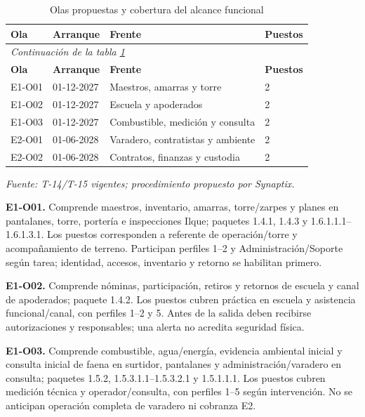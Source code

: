 \begingroup\small\setlength{\tabcolsep}{3pt}
\begin{longtable}{p{}p{}p{}p{}}
\caption{Olas propuestas y cobertura del alcance funcional}\label{tab:t18-olas}\\\hline
\textbf{Ola} & \textbf{Arranque} & \textbf{Frente} & \textbf{Puestos}\\\hline\endfirsthead
\multicolumn{4}{l}{\textit{Continuación de la tabla \ref{tab:t18-olas}}}\\\hline
\textbf{Ola} & \textbf{Arranque} & \textbf{Frente} & \textbf{Puestos}\\\hline\endhead
\hline\endfoot\hline\endlastfoot
E1-O01 & 01-12-2027 & Maestros, amarras y torre & 2\\\hline
E1-O02 & 01-12-2027 & Escuela y apoderados & 2\\\hline
E1-O03 & 01-12-2027 & Combustible, medición y consulta & 2\\\hline
E2-O01 & 01-06-2028 & Varadero, contratistas y ambiente & 2\\\hline
E2-O02 & 01-06-2028 & Contratos, finanzas y custodia & 2\\\hline
\end{longtable}\endgroup
\noindent\textit{Fuente: T-14/T-15 vigentes; procedimiento propuesto por Synaptix.}

\textbf{E1-O01.} Comprende maestros, inventario, amarras, torre/zarpes y planes en pantalanes, torre, portería e inspecciones Ilque; paquetes 1.4.1, 1.4.3 y 1.6.1.1.1--1.6.1.3.1. Los puestos corresponden a referente de operación/torre y acompañamiento de terreno. Participan perfiles 1--2 y Administración/Soporte según tarea; identidad, accesos, inventario y retorno se habilitan primero.

\textbf{E1-O02.} Comprende nóminas, participación, retiros y retornos de escuela y canal de apoderados; paquete 1.4.2. Los puestos cubren práctica en escuela y asistencia funcional/canal, con perfiles 1--2 y 5. Antes de la salida deben recibirse autorizaciones y responsables; una alerta no acredita seguridad física.

\textbf{E1-O03.} Comprende combustible, agua/energía, evidencia ambiental inicial y consulta inicial de faena en surtidor, pantalanes y administración/varadero en consulta; paquetes 1.5.2, 1.5.3.1.1--1.5.3.2.1 y 1.5.1.1.1. Los puestos cubren medición técnica y operador/consulta, con perfiles 1--5 según intervención. No se anticipan operación completa de varadero ni cobranza E2.

